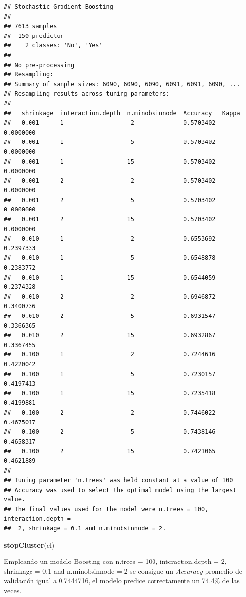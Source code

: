\documentclass[]{article}
\newenvironment{Shaded}{\begin{snugshade}}{\end{snugshade}}
\newcommand{\KeywordTok}[1]{\textcolor[rgb]{0.13,0.29,0.53}{\textbf{#1}}}
\newcommand{\NormalTok}[1]{#1}
\begin{document}
\begin{verbatim}
## Stochastic Gradient Boosting 
## 
## 7613 samples
##  150 predictor
##    2 classes: 'No', 'Yes' 
## 
## No pre-processing
## Resampling: 
## Summary of sample sizes: 6090, 6090, 6090, 6091, 6091, 6090, ... 
## Resampling results across tuning parameters:
## 
##   shrinkage  interaction.depth  n.minobsinnode  Accuracy   Kappa    
##   0.001      1                   2              0.5703402  0.0000000
##   0.001      1                   5              0.5703402  0.0000000
##   0.001      1                  15              0.5703402  0.0000000
##   0.001      2                   2              0.5703402  0.0000000
##   0.001      2                   5              0.5703402  0.0000000
##   0.001      2                  15              0.5703402  0.0000000
##   0.010      1                   2              0.6553692  0.2397333
##   0.010      1                   5              0.6548878  0.2383772
##   0.010      1                  15              0.6544059  0.2374328
##   0.010      2                   2              0.6946872  0.3400736
##   0.010      2                   5              0.6931547  0.3366365
##   0.010      2                  15              0.6932867  0.3367455
##   0.100      1                   2              0.7244616  0.4220042
##   0.100      1                   5              0.7230157  0.4197413
##   0.100      1                  15              0.7235418  0.4199881
##   0.100      2                   2              0.7446022  0.4675017
##   0.100      2                   5              0.7438146  0.4658317
##   0.100      2                  15              0.7421065  0.4621889
## 
## Tuning parameter 'n.trees' was held constant at a value of 100
## Accuracy was used to select the optimal model using the largest value.
## The final values used for the model were n.trees = 100, interaction.depth =
##  2, shrinkage = 0.1 and n.minobsinnode = 2.
\end{verbatim}

\begin{Shaded}
\begin{Highlighting}[]
\KeywordTok{stopCluster}\NormalTok{(cl)}
\end{Highlighting}
\end{Shaded}

Empleando un modelo Boosting con n.trees = 100, interaction.depth = 2,
shrinkage = 0.1 and n.minobsinnode = 2 se consigue un \emph{Accuracy}
promedio de validación igual a 0.7444716, el modelo predice
correctamente un 74.4\% de las veces.
\end{document}

